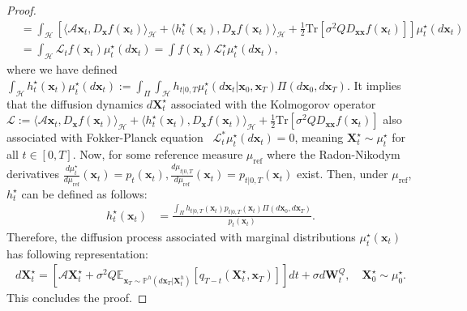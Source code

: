 \documentclass[nohyperref]{article}
\theoremstyle{plain}
\theoremstyle{remark}
\newcommand{\la}{\langle}
\newcommand{\ra}{\rangle}
\newcommand{\mc}{\mathcal}
\newcommand{\mb}{\mathbf}
\begin{document}
\begin{proof}
\begin{align}
 & = \int_{\mc{H}} \left[ \la \mc{A}\mb{x}_t, D_{\mb{x}} f(\mb{x}_t)\ra_{\mc{H}} +  \la h^{\star}_t(\mb{x}_t) ,D_{\mb{x}} f(\mb{x}_t)\ra_{\mc{H}} + \frac{1}{2}\text{Tr}\left[ \sigma^2 Q D_{\mb{xx}}f(\mb{x}_t)\right] \right] \mu^{\star}_t(d\mb{x}_t) \\
 & = \int_{\mc{H}} \mc{L}_t f(\mb{x}_t) \mu^{\star}_{t}(d\mb{x}_t) = \int f(\mb{x}_t)  \mc{L}_t^{\star}  \mu^{\star}_t(d\mb{x}_t),
\end{align}
where we have defined $\int_{\mc{H}} h^{\star}_t(\mb{x}_t) \mu^{\star}_t(d\mb{x}_t) :=  \int_{\Pi} \int_{\mc{H}} h_{t|0, T} \mu^{\star}_t(d\mb{x}_t|\mb{x}_0, \mb{x}_T)\Pi(d\mb{x}_0, d\mb{x}_T)$. It implies that the diffusion dynamics $d\mb{X}_t^{\star}$ associated with the Kolmogorov operator $\mc{L} :=\la \mc{A}\mb{x}_t, D_{\mb{x}} f(\mb{x}_t)\ra_{\mc{H}} +  \la h^{\star
 }_t(\mb{x}_t) ,D_{\mb{x}} f(\mb{x}_t)\ra_{\mc{H}} + \frac{1}{2}\text{Tr}\left[ \sigma^2 Q D_{\mb{xx}}f(\mb{x}_t)\right]$ also associated with Fokker-Planck equation~\citep{bogachev2011uniqueness} $\mc{L}_t^{*}  \mu^{\star}_t(d\mb{x}_t)=0$, meaning $\mb{X}_t^{\star} \sim \mu^{\star}_t$ for all $t \in [0, T]$. Now, for some reference measure $\mu_{\text{ref}}$ 
 where the Radon-Nikodym derivatives $\frac{d\mu^{\star}_t}{d\mu_{\text{ref}}}(\mb{x}_t) = p_t(\mb{x}_t), \frac{d\mu_{t|0, T}}{d\mu_{\text{ref}}}(\mb{x}_t) = p_{t|0, T}(\mb{x}_t)$ exist. Then, under $\mu_{\text{ref}}$, $h^{\star}_t$ can be defined as follows:
\begin{align}
        h^{\star}_t(\mb{x}_t) 
        &=  \frac{\int_{\Pi} h_{t|0, T}(\mb{x}_t) p_{t|0, T}(\mb{x}_t)   \Pi(d\mb{x}_0, d\mb{x}_T)}{p_t(\mb{x}_t)}.
\end{align}
Therefore, the diffusion process associated with marginal distributions $\mu^{\star}_t(\mb{x}_t)$ has following representation:
\begin{align}
    d\mb{X}^{\star}_t = \left[\mc{A}\mb{X}^{\star}_t + \sigma^2 Q \mathbb{E}_{\mb{x}_T \sim \mathbb{P}^h(d\mb{x}_T|\mb{X}^{h}_t)}\left[q_{T-t}(\mb{X}^{\star}_t, \mb{x}_T)\right] \right]dt + \sigma d\mb{W}^Q_t, \quad \mb{X}^{\star}_0 \sim \mu^{\star}_0.
\end{align}
This concludes the proof.
\end{proof}
\end{document}
